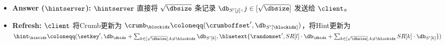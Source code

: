 \begin{mdframed}
\begin{itemize}
\begin{itemize}
                  \end{itemize}
            \item \textbf{Answer ($\hintserver$):} $\hintserver$ 直接将 $\sqrt{\dbsize}$ 条记录 $\db_{S'[j]}, j\in [\sqrt{\dbsize}]$ 发送给 $\client$。
            \item \textbf{Refresh:} $\client$ 将Crumb更新为 $\crumb_\blockidx \coloneqq  (\crumboffset', \db_{S'[\blockidx]})$，将Hint更新为 $\hint_\hintidx \coloneqq  (\setkey',\db_\dbidx + \sum_{k\in [\sqrt{\dbsize}],k\neq \blockidx}\db_{S'[k]}, \bluetext{\randomset', SR[l]\cdot \db_\dbidx + \sum_{k\in [\sqrt{\dbsize}],k\neq \blockidx}SR[k]\cdot \db_{S'[k]}})$
        \end{itemize}
    \end{mdframed}
    \label{fig:two-server-verify}


    

